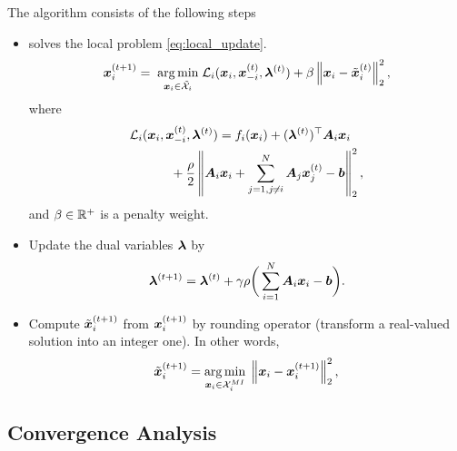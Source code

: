 \documentclass[twocolumn,amsthm]{autart}%
\theoremstyle{definition}
\theoremstyle{plain}
\begin{document}
The algorithm consists of the following steps
\begin{itemize}
\item {} solves the local problem \eqref{eq:local_update}.
\begin{equation}
\label{eq:local_update}
\boldsymbol{x}_i^{(t+1)} = \; \underset{\boldsymbol{x}_i \in \tilde{\mathcal{X}}_i}{\operatorname*{arg\,min}}  \; \mathcal{L}_i (\boldsymbol{x}_i, \boldsymbol{x}_{-i}^{(t)}, \boldsymbol{\lambda}^{(t)}) + \beta \left\lVert \boldsymbol{x}_i - \tilde{\boldsymbol{x}}_i^{(t)} \right\rVert_2^2,
\end{equation}
where 
\begin{equation}
\begin{multlined}
\LLL_i (\bbsym{x}_i, \bbsym{x}_{-i}^{(t)}, \bbsym{\lambda}^{(t)}) = f_i ( \bbsym{x}_i) + (\bbsym{\lambda}^{(t)})^\top \bbsym{A}_{i} \bbsym{x}_i \\
+ \frac{\rho}{2} \norm{\bbsym{A}_{i} \bbsym{x}_i + \sum_{j=1, j\neq i}^N \bbsym{A}_{j} \bbsym{x}_j^{(t)} - \bbsym{b}}_2^2 ,
\end{multlined}
\end{equation}
and $\beta \in \mathbb{R}^{+}$ is a penalty weight.

\item Update the dual variables $\boldsymbol{\lambda}$ by 
\begin{equation}
\boldsymbol{\lambda}^{(t+1)} = \boldsymbol{\lambda}^{(t)} + \gamma \rho \bigg( \sum_{i=1}^{N} \boldsymbol{A}_{i} \boldsymbol{x}_i - \boldsymbol{b} \bigg).
\end{equation}


\item Compute $\tilde{\boldsymbol{x}}_i^{(t+1)}$ from $\boldsymbol{x}_i^{(t+1)}$ by rounding operator (transform a real-valued solution into an integer one). 
In other words,
\begin{equation}
\tilde{\boldsymbol{x}}_i^{(t+1)} = \underset{\boldsymbol{x}_i \in \mathcal{X}_i^{\relax{MI}}}{\operatorname*{arg\,min}} \;
\left\lVert \boldsymbol{x}_i - \boldsymbol{x}_i^{(t+1)} \right\rVert_2^2,
\end{equation}
\end{itemize}




\subsection{Convergence Analysis}
\end{document}
